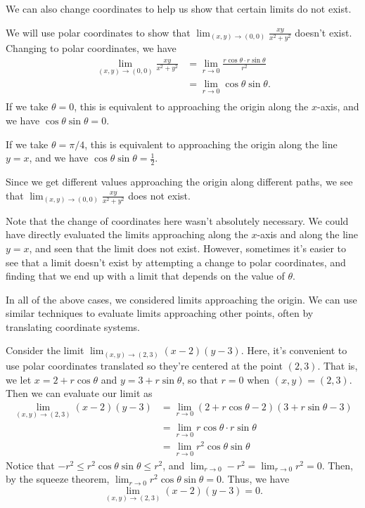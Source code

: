 \documentclass{ximera}
\begin{document}
We can also change coordinates to help us show that certain limits do not exist.

\begin{example}
We will use polar coordinates to show that $\lim_{(x,y)\rightarrow (0,0)} \frac{xy}{x^2+y^2}$ doesn't exist. Changing to polar coordinates, we have
\begin{align*}
\lim_{(x,y)\rightarrow (0,0)} \frac{xy}{x^2+y^2} &= \lim_{r\rightarrow 0}\frac{r\cos\theta\cdot r\sin\theta}{r^2}\\
&= \lim_{r\rightarrow 0}\cos\theta \sin\theta.\\
\end{align*}
If we take $\theta = 0$, this is equivalent to approaching the origin along the $x$-axis, and we have $\cos\theta\sin\theta = 0$.

If we take $\theta = \pi/4$, this is equivalent to approaching the origin along the line $y=x$, and we have $\cos\theta\sin\theta = \frac{1}{2}$.

Since we get different values approaching the origin along different paths, we see that $\lim_{(x,y)\rightarrow (0,0)} \frac{xy}{x^2+y^2}$ does not exist.

Note that the change of coordinates here wasn't absolutely necessary. We could have directly evaluated the limits approaching along the $x$-axis and along the line $y=x$, and seen that the limit does not exist. However, sometimes it's easier to see that a limit doesn't exist by attempting a change to polar coordinates, and finding that we end up with a limit that depends on the value of $\theta$.
\end{example}

In all of the above cases, we considered limits approaching the origin. We can use similar techniques to evaluate limits approaching other points, often by translating coordinate systems.

\begin{example}
Consider the limit $\lim_{(x,y)\rightarrow(2,3)} (x-2)(y-3)$. Here, it's convenient to use polar coordinates translated so they're centered at the point $(2,3)$. That is, we let $x = 2+r\cos\theta $ and $y=3+r\sin\theta$, so that $r=0$ when $(x,y)=(2,3)$. Then we can evaluate our limit as
\begin{align*}
\lim_{(x,y)\rightarrow(2,3)} (x-2)(y-3) &= \lim_{r\rightarrow 0}(2+r\cos\theta-2)(3+r\sin\theta -3)\\
&=\lim_{r\rightarrow 0}r\cos\theta\cdot r\sin\theta\\
&= \lim_{r\rightarrow 0}r^2\cos\theta\sin\theta
\end{align*}
Notice that $-r^2\leq r^2\cos\theta\sin\theta\leq r^2$, and $\lim_{r\rightarrow 0}-r^2 = \lim_{r\rightarrow 0}r^2 = 0$. Then, by the squeeze theorem, $\lim_{r\rightarrow 0} r^2\cos\theta\sin\theta =0$. Thus, we have
\[
\lim_{(x,y)\rightarrow(2,3)} (x-2)(y-3) = 0.
\]
\end{example}
\end{document}
